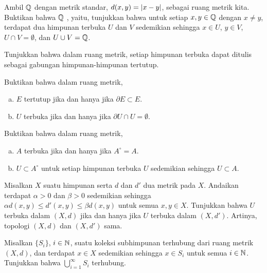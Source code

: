 \begin{exercise}
Ambil ${\mathbb{Q}}$ dengan metrik standar, $d(x,y) = \lvert {x-y} \rvert$, sebagai ruang metrik kita.
Buktikan bahwa ${\mathbb{Q}}$
\emph{}, yaitu, tunjukkan 
bahwa untuk setiap $x, y \in {\mathbb{Q}}$ dengan $x \neq y$, terdapat
dua himpunan terbuka $U$ dan $V$ sedemikian sehingga $x \in U$, $y \in V$,
$U \cap V = \emptyset$, dan $U \cup V = {\mathbb{Q}}$.
\end{exercise}

\begin{exercise}
Tunjukkan bahwa dalam ruang metrik,
setiap himpunan terbuka dapat ditulis sebagai gabungan himpunan-himpunan tertutup.
\end{exercise}

\begin{samepage}
\begin{exercise}
Buktikan bahwa dalam ruang metrik,
\begin{enumerate}[a)]
\item
$E$ tertutup jika dan hanya jika $\partial E \subset E$.
\item
$U$ terbuka jika dan hanya jika $\partial U \cap U = \emptyset$.
\end{enumerate}
\end{exercise}
\end{samepage}

\begin{exercise}
Buktikan bahwa dalam ruang metrik,
\begin{enumerate}[a)]
\item
$A$ terbuka jika dan hanya jika $A^\circ = A$.
\item
$U \subset A^\circ$
untuk setiap himpunan terbuka $U$ sedemikian sehingga $U \subset A$.
\end{enumerate}
\end{exercise}

\begin{exercise}
Misalkan $X$ suatu himpunan serta $d$ dan $d'$ dua metrik pada $X$.
Andaikan terdapat $\alpha > 0$ dan $\beta > 0$
sedemikian sehingga $\alpha d(x,y) \leq d'(x,y) \leq \beta d(x,y)$ untuk semua $x,y \in X$.
Tunjukkan bahwa $U$ terbuka dalam $(X,d)$ jika dan hanya jika $U$ terbuka dalam $(X,d')$.
Artinya, topologi $(X,d)$ dan $(X,d')$ sama.
\end{exercise}


\begin{exercise}
Misalkan $\{ S_i \}$, $i \in {\mathbb{N}}$,
suatu koleksi subhimpunan terhubung dari ruang metrik $(X,d)$,
dan terdapat $x \in X$ sedemikian sehingga $x \in S_i$ untuk semua $i \in {\mathbb{N}}$.
Tunjukkan bahwa $\bigcup_{i=1}^\infty S_i$ terhubung.
\end{exercise}

